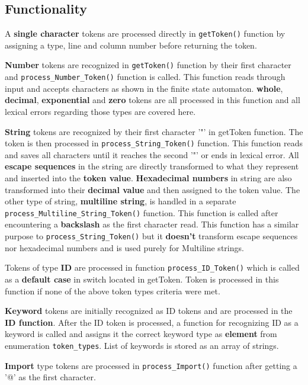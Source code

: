 \documentclass[a4paper, 11pt]{article}
\begin{document}
\subsection{Functionality}
A \textbf{single character} tokens are processed directly in \verb|getToken()| function by assigning a type, line and 
column number before returning the token.
\par
\textbf{Number} tokens are recognized in \verb|getToken()| function by their first character and \verb|process_Number_Token()| 
function is called. This function reads through input and accepts characters as shown in the finite state automaton. 
\textbf{whole}, \textbf{decimal}, \textbf{exponential} and \textbf{zero} tokens are all processed in this function 
and all lexical errors regarding those types are covered here. 
\par
\textbf{String} tokens are recognized by their first character '"' in getToken function. The token is then processed 
in \verb|process_String_Token()| function. This function reads and saves all characters until it reaches the second '"' 
or ends in lexical error. All \textbf{escape sequences} in the string are directly transformed to what they represent 
and inserted into the \textbf{token value}. \textbf{Hexadecimal numbers} in string are also transformed into their 
\textbf{decimal value} and then assigned to the token value. The other type of string, \textbf{multiline string}, 
is handled in a separate \verb|process_Multiline_String_Token()| function. This function is called after encountering 
a \textbf{backslash} as the first character read. This function has a similar purpose to \verb|process_String_Token()| but it \textbf{doesn't} 
transform escape sequences nor hexadecimal numbers and is used purely for Multiline strings.
\par
Tokens of type \textbf{ID} are processed in function \verb|process_ID_Token()| which is called as a \textbf{default case} 
in switch located in getToken. Token is processed in this function if none of the above token types criteria were met.
\par
\textbf{Keyword} tokens are initially recognized as ID tokens and are processed in the \textbf{ID function}. After the ID token 
is processed, a function for recognizing ID as a keyword is called and assigns it the correct keyword type as \textbf{element} from enumeration \verb|token_types|. List of keywords is stored
as an array of strings.
\par
\textbf{Import} type tokens are processed in \verb|process_Import()| function after getting a '@' as the first character. 
\end{document}

